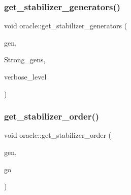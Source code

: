 \mbox{\label{classoracle_a55d6b99a05f74278f7cb0e9d9761da24}} 
\subsubsection{\texorpdfstring{get\+\_\+stabilizer\+\_\+generators()}{get\_stabilizer\_generators()}}
{\footnotesize\ttfamily void oracle\+::get\+\_\+stabilizer\+\_\+generators (\begin{DoxyParamCaption}\item[{\mbox{\hyperlink{classgenerator}{generator}} $\ast$}]{gen,  }\item[{\mbox{\hyperlink{classstrong__generators}{strong\+\_\+generators}} $\ast$\&}]{Strong\+\_\+gens,  }\item[{\mbox{\hyperlink{galois_8h_a09fddde158a3a20bd2dcadb609de11dc}{I\+NT}}}]{verbose\+\_\+level }\end{DoxyParamCaption})}

\mbox{\label{classoracle_aa3e1c014a85faf719d8ba33f38189d56}} 
\subsubsection{\texorpdfstring{get\+\_\+stabilizer\+\_\+order()}{get\_stabilizer\_order()}}
{\footnotesize\ttfamily void oracle\+::get\+\_\+stabilizer\+\_\+order (\begin{DoxyParamCaption}\item[{\mbox{\hyperlink{classgenerator}{generator}} $\ast$}]{gen,  }\item[{\mbox{\hyperlink{classlonginteger__object}{longinteger\+\_\+object}} \&}]{go }\end{DoxyParamCaption})}

\mbox{\label{classoracle_afa9983d0c22028563d6a6b812c888b32}} 
